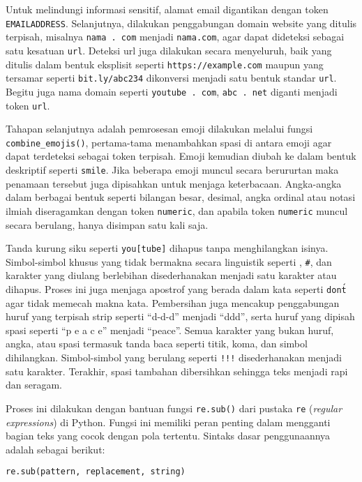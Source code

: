 \documentclass[a4paper,12pt]{report}
\numberwithin{equation}{chapter}
\begin{document}
Untuk melindungi informasi sensitif, alamat email digantikan dengan token \texttt{EMAILADDRESS}. Selanjutnya, dilakukan penggabungan domain website yang ditulis terpisah, misalnya \texttt{nama . com} menjadi \texttt{nama.com}, agar dapat dideteksi sebagai satu kesatuan \texttt{url}. Deteksi url juga dilakukan secara menyeluruh, baik yang ditulis dalam bentuk   eksplisit seperti \texttt{https://example.com} maupun yang tersamar seperti \texttt{bit.ly/abc234} dikonversi menjadi satu bentuk standar \texttt{url}. Begitu juga nama domain seperti \texttt{youtube . com}, \texttt{abc . net} diganti menjadi token  \texttt{url}.

Tahapan selanjutnya adalah pemrosesan emoji dilakukan melalui fungsi \texttt{combine\_emojis()}, pertama-tama menambahkan spasi di antara emoji agar dapat terdeteksi sebagai token terpisah. Emoji kemudian diubah ke dalam bentuk deskriptif seperti \texttt{\:smile\:}. Jika beberapa emoji muncul secara berururtan maka penamaan tersebut juga dipisahkan untuk menjaga keterbacaan.  Angka-angka dalam berbagai bentuk seperti bilangan besar, desimal, angka ordinal atau notasi ilmiah diseragamkan dengan token \texttt{numeric}, dan apabila token \texttt{numeric} muncul secara berulang, hanya disimpan satu kali saja. 

Tanda kurung siku seperti \texttt{you[tube]} dihapus tanpa menghilangkan isinya. Simbol-simbol khusus yang tidak bermakna secara linguistik seperti \texttt{\!\!\!\!}, \texttt{\#}, dan karakter yang diulang berlebihan disederhanakan menjadi satu karakter atau dihapus. Proses ini juga menjaga apostrof yang berada dalam kata seperti \texttt{don\'t} agar tidak memecah makna kata. Pembersihan juga mencakup penggabungan huruf yang terpisah strip seperti ``d-d-d'' menjadi ``ddd'', serta huruf yang dipisah spasi seperti ``p e a c e'' menjadi ``peace''. Semua karakter yang bukan huruf, angka, atau spasi termasuk tanda baca seperti titik, koma, dan simbol dihilangkan. Simbol-simbol yang berulang seperti \texttt{!!!} disederhanakan menjadi satu karakter. Terakhir, spasi tambahan dibersihkan sehingga teks menjadi rapi dan seragam.

Proses ini dilakukan dengan bantuan fungsi \texttt{re.sub()} dari pustaka \texttt{re} (\textit{regular expressions}) di Python. Fungsi ini memiliki peran penting dalam mengganti bagian teks yang cocok dengan pola tertentu. Sintaks dasar penggunaannya adalah sebagai berikut:

\begin{center}
\texttt{re.sub(pattern, replacement, string)}
\end{center}
\end{document}
